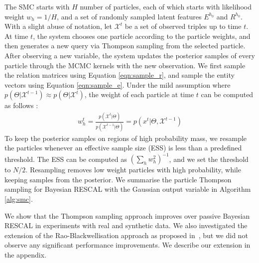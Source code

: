 The SMC starts with $H$ number of particles, each of which starts with likelihood
weight $w_{h} = 1/H$, and a set of randomly sampled latent features $E^{h_0}$ and $R^{h_0}$.
With a slight abuse of notation, let $\mathcal{X}^{t}$ be a set of observed triples up to time $t$.
At time $t$, the system chooses one particle according to the particle weights,
and then generates a new query via Thompson sampling from the selected particle.
After observing a new variable, the system updates the posterior samples of
every particle through the MCMC kernels with the new observation.
We first sample the relation matrices using Equation \ref{eqn:sample_r}, and sample the entity vectors using Equation \ref{eqn:sample_e}.
Under the mild assumption where
$p(\Theta | \mathcal{X}^{t-1}) \approx p(\Theta | \mathcal{X}^{t})$,
the weight of each particle at time $t$ can be computed as follows
\cite{del2006sequential,chopin2002sequential}:
\begin{align}
w_{h}^{t} = \frac{p(\mathcal{X}^{t} | \Theta)}{p(\mathcal{X}^{t-1} | \Theta)}
 = p(x^{t} | \Theta, \mathcal{X}^{t-1})
\end{align}
To keep the posterior samples
on regions of high probability mass, we resample the particles whenever
an effective sample size (ESS) is less than a predefined threshold.
The ESS can be computed as $(\sum_h w_h^2)^{-1}$, and we set the threshold
to $N/2$. Resampling removes low weight particles with high probability,
while keeping samples from the posterior.
We summarise the particle Thompson sampling for Bayesian RESCAL with the
Gaussian output variable in Algorithm \ref{alg:smc}.

We show that the Thompson sampling approach improves over passive Bayesian RESCAL in
experiments with real and synthetic data.
We also investigated the extension of the Rao-Blackwellisation approach as proposed
in~\cite{kawale2015efficient}, but we did not observe any significant performance improvements.
We describe our extension in the appendix.

%

